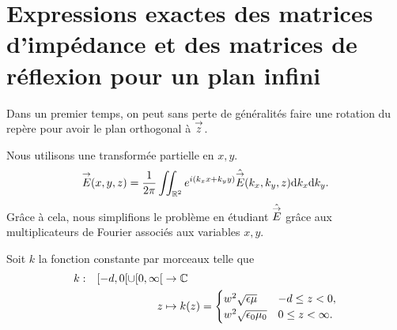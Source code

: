 \section[Opérateur de Calderón pour un plan]{Expressions exactes des matrices d'impédance et des matrices de réflexion pour un plan infini}

    Dans un premier temps, on peut sans perte de généralités faire une rotation du repère pour avoir le plan orthogonal à \(\vect{z}\).
    \begin{figure}[!h]
        \begin{center}
            \begin{tikzpicture}
                
            \end{tikzpicture}
        \end{center}
    \end{figure}
    Nous utilisons une transformée partielle en \(x, y\).
    \begin{equation*}
        \vE(x,y,z) = \frac{1}{2\pi}\iint_{\RR^2} e^{i(k_x x + k_y y)}\hat{\vE} (k_x,k_y,z) \dd{k_x}\dd{k_y.}
    \end{equation*}
    Grâce à cela, nous simplifions le problème en étudiant \( \hat{\vE}\) grâce aux multiplicateurs de Fourier associés aux variables \(x,y\). 

    Soit \(k\) la fonction constante par morceaux telle que
    \begin{equation*}
    \fonction{k}{[-d,0[\cup[0,\infty[}{\CC}
          {z}{k(z)=
          \begin{cases} 
            w^2\sqrt{\eps\mu} & -d \le z < 0,
            \\
            w^2\sqrt{\eps_0\mu_0} & 0\le z < \infty.
          \end{cases}}
    \end{equation*}

